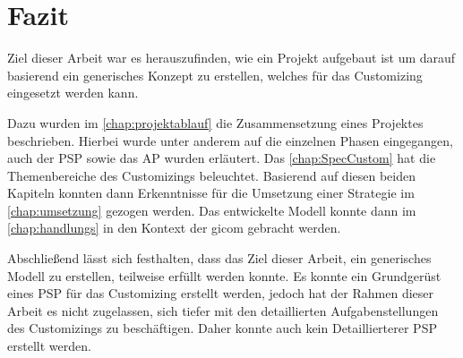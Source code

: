 \chapter{Fazit}

	Ziel dieser Arbeit war es herauszufinden, wie ein Projekt aufgebaut ist um darauf basierend ein generisches Konzept zu erstellen, welches für das Customizing eingesetzt werden kann. 
	
	Dazu wurden im \autoref{chap:projektablauf} die Zusammensetzung eines Projektes beschrieben. Hierbei wurde unter anderem auf die einzelnen Phasen eingegangen, auch der \ac{PSP} sowie das \ac{AP} wurden erläutert. Das \autoref{chap:SpecCustom}  hat die Themenbereiche des Customizings beleuchtet. Basierend auf diesen beiden Kapiteln konnten dann Erkenntnisse für die Umsetzung einer Strategie im \autoref{chap:umsetzung} gezogen werden. Das entwickelte Modell konnte dann im \autoref{chap:handlungs} in den Kontext der gicom gebracht werden.  
	
	Abschließend lässt sich festhalten, dass das Ziel dieser Arbeit, ein generisches Modell zu erstellen, teilweise erfüllt werden konnte. Es konnte ein Grundgerüst eines \ac{PSP} für das Customizing erstellt werden, jedoch hat der Rahmen dieser Arbeit es nicht zugelassen, sich tiefer mit den detaillierten Aufgabenstellungen des Customizings zu beschäftigen. Daher konnte auch kein Detaillierterer \acs{PSP} erstellt werden.  